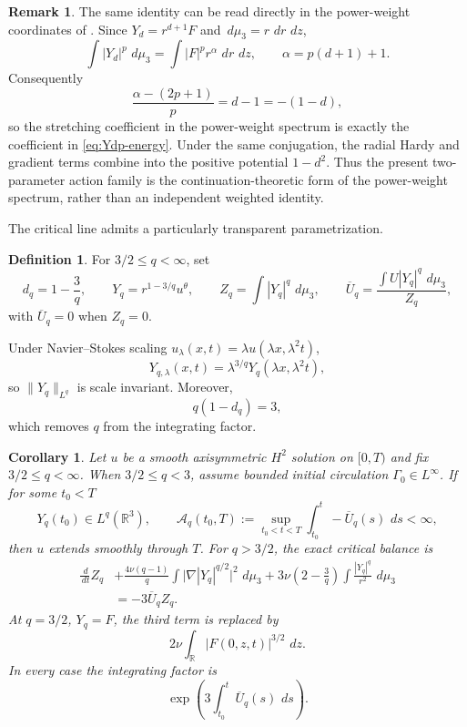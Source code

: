 \documentclass[11pt]{article}
\numberwithin{equation}{section}
\newtheorem{corollary}[corollary]{Corollary}
\theoremstyle{definition}
\newtheorem{remark}[remark]{Remark}
\newtheorem{definition}[definition]{Definition}
\newcommand{\R}{\mathbb R}
\newcommand{\dd}{\,d}
\begin{document}
\begin{remark}\label{rem:paper3-dictionary}
The same identity can be read directly in the power-weight coordinates of \cite{ShahmurovHardy2026}.  Since $Y_d=r^{d+1}F$ and $\dd\mu_3=r\,\dd r\,\dd z$,
\[
 \int |Y_d|^p\,\dd\mu_3
 =\int |F|^p r^{\alpha}\,\dd r\,\dd z,
 \qquad
 \alpha=p(d+1)+1.
\]
Consequently
\[
 \frac{\alpha-(2p+1)}p=d-1=-(1-d),
\]
so the stretching coefficient in the power-weight spectrum is exactly the coefficient in \cref{eq:Ydp-energy}.  Under the same conjugation, the radial Hardy and gradient terms combine into the positive potential $1-d^2$.  Thus the present two-parameter action family is the continuation-theoretic form of the power-weight spectrum, rather than an independent weighted identity.
\end{remark}

The critical line admits a particularly transparent parametrization.

\begin{definition}\label{def:critical-family}
For $3/2\le q<\infty$, set
\begin{equation}\label{eq:critical-Yq}
 d_q=1-\frac3q,
 \qquad
 Y_q=r^{1-3/q}u^\theta,
 \qquad
 Z_q=\int|Y_q|^q\,\dd\mu_3,
 \qquad
 \overline U_q=\frac{\int U|Y_q|^q\,\dd\mu_3}{Z_q},
\end{equation}
with $\overline U_q=0$ when $Z_q=0$.
\end{definition}

Under Navier--Stokes scaling $u_\lambda(x,t)=\lambda u(\lambda x,\lambda^2t)$,
\[
 Y_{q,\lambda}(x,t)=\lambda^{3/q}Y_q(\lambda x,\lambda^2t),
\]
so $\|Y_q\|_{L^q}$ is scale invariant.  Moreover,
\[
 q(1-d_q)=3,
\]
which removes $q$ from the integrating factor.

\begin{corollary}\label{cor:critical-family}
Let $u$ be a smooth axisymmetric $H^2$ solution on $[0,T)$ and fix $3/2\le q<\infty$.  When $3/2\le q<3$, assume bounded initial circulation $\Gamma_0\in L^\infty$.  If for some $t_0<T$
\begin{equation}\label{eq:critical-action-hyp}
 Y_q(t_0)\in L^q(\R^3),
 \qquad
 \mathcal A_q(t_0,T)
 :=\sup_{t_0<t<T}\int_{t_0}^t-\overline U_q(s)\,\dd s<\infty,
\end{equation}
then $u$ extends smoothly through $T$.
For $q>3/2$, the exact critical balance is
\begin{align}\label{eq:critical-balance}
 \frac{\dd}{\dd t}Z_q
 &+\frac{4\nu(q-1)}q
   \int\bigl|\nabla |Y_q|^{q/2}\bigr|^2\,\dd\mu_3
 +3\nu\left(2-\frac3q\right)
   \int\frac{|Y_q|^q}{r^2}\,\dd\mu_3\\
 &=-3\overline U_q Z_q.
\end{align}
At $q=3/2$, $Y_q=F$, the third term is replaced by
\[
 2\nu\int_\R|F(0,z,t)|^{3/2}\,\dd z.
\]
In every case the integrating factor is
\begin{equation}\label{eq:universal-critical-factor}
 \exp\left(3\int_{t_0}^t\overline U_q(s)\,\dd s\right).
\end{equation}
\end{corollary}
\end{document}
